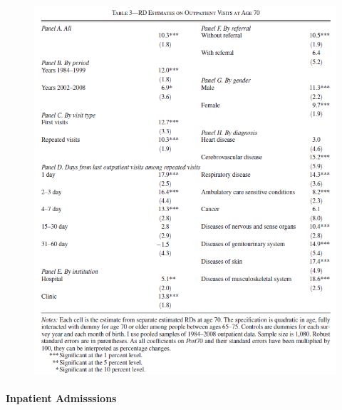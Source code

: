 \documentclass[../root]{subfiles}
\begin{document}
    \begin{figure}[ht]
      \centering
      \includegraphics[scale = 1]{0710tanji/T3}
    \end{figure}

    \paragraph{Inpatient Admisssions}
\end{document}
